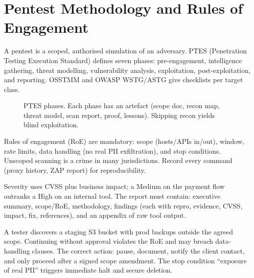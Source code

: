 \section{Pentest Methodology and Rules of Engagement}
\label{sec:pentest}
A pentest is a scoped, authorised simulation of an adversary. PTES (Penetration Testing Execution Standard) defines seven phases: pre-engagement, intelligence gathering, threat modelling, vulnerability analysis, exploitation, post-exploitation, and reporting. OSSTMM and OWASP WSTG/ASTG give checklists per target class.

\begin{figure}[h]\centering
{}
\caption{PTES phases. Each phase has an artefact (scope doc, recon map, threat model, scan report, proof, lessons). Skipping recon yields blind exploitation.}
\label{fig:ptes}
\end{figure}

Rules of engagement (RoE) are mandatory: scope (hosts/APIs in/out), window, rate limits, data handling (no real PII exfiltration), and stop conditions. Unscoped scanning is a crime in many jurisdictions. Record every command (proxy history, ZAP report) for reproducibility.

Severity uses CVSS plus business impact; a Medium on the payment flow outranks a High on an internal tool. The report must contain: executive summary, scope/RoE, methodology, findings (each with repro, evidence, CVSS, impact, fix, references), and an appendix of raw tool output.

\begin{example}
A tester discovers a staging S3 bucket with prod backups outside the agreed scope. Continuing without approval violates the RoE and may breach data-handling clauses. The correct action: pause, document, notify the client contact, and only proceed after a signed scope amendment. The stop condition ``exposure of real PII'' triggers immediate halt and secure deletion.
\end{example}

